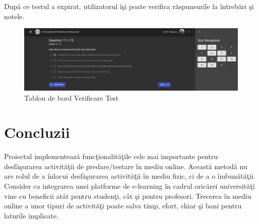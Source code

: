\documentclass[12pt, a4paper, oneside, romanian]{teza-upb}
\begin{document}
După ce testul a expirat, utilizatorul îşi poate verifica răspunsurile la întrebări şi notele.

\begin{figure}[H]
\centering
\includegraphics*[width=\columnwidth]{tablou-de-bord-verificare-test}
\caption{Tablou de bord Verificare Test}
\label{tablou-de-bord-verificare-test}
\end{figure}




\chapter*{Concluzii}

Proiectul implementează funcţionalităţile cele mai importante pentru desfăşurarea activităţii de predare/testare în mediu online. Această metodă nu are rolul de a înlocui desfăşurarea activităţii în mediu fizic, ci de a o îmbunătăţii. Consider ca integrarea unei platforme de e-learning în cadrul oricărei universităţi vine cu beneficii atât pentru studenţi, cât şi pentru profesori. Trecerea în mediu online a unor tipuri de activităţi poate salva timp, efort, chiar şi bani pentru laturile implicate.
\end{document}
